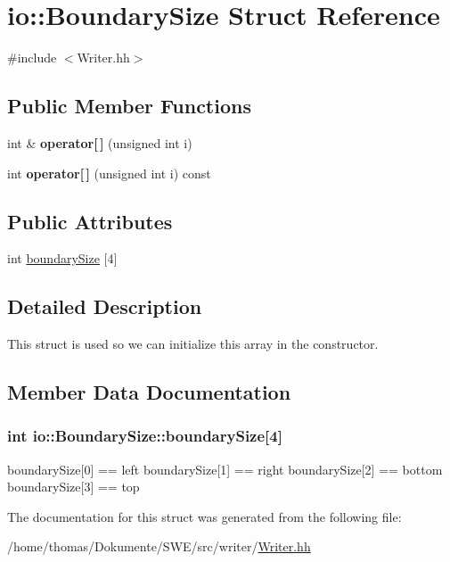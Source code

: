 \hypertarget{structio_1_1BoundarySize}{\section{io\-:\-:Boundary\-Size Struct Reference}
\label{structio_1_1BoundarySize}
}


{\ttfamily \#include $<$Writer.\-hh$>$}

\subsection*{Public Member Functions}
\begin{DoxyCompactItemize}
\item 
\hypertarget{structio_1_1BoundarySize_a4130ec88292d4a0eff9c402a90ef907d}{int \& {\bfseries operator\mbox{[}$\,$\mbox{]}} (unsigned int i)}\label{structio_1_1BoundarySize_a4130ec88292d4a0eff9c402a90ef907d}

\item 
\hypertarget{structio_1_1BoundarySize_ab7593d2a82890d5d255c30d1dd8fee08}{int {\bfseries operator\mbox{[}$\,$\mbox{]}} (unsigned int i) const }\label{structio_1_1BoundarySize_ab7593d2a82890d5d255c30d1dd8fee08}

\end{DoxyCompactItemize}
\subsection*{Public Attributes}
\begin{DoxyCompactItemize}
\item 
int \hyperlink{structio_1_1BoundarySize_ae1ac1aecc0b840076b68948dc2ceba8a}{boundary\-Size} \mbox{[}4\mbox{]}
\end{DoxyCompactItemize}


\subsection{Detailed Description}
This struct is used so we can initialize this array in the constructor. 

\subsection{Member Data Documentation}
\hypertarget{structio_1_1BoundarySize_ae1ac1aecc0b840076b68948dc2ceba8a}{
\subsubsection[{boundary\-Size}]{\setlength{\rightskip}{0pt plus 5cm}int io\-::\-Boundary\-Size\-::boundary\-Size\mbox{[}4\mbox{]}}}\label{structio_1_1BoundarySize_ae1ac1aecc0b840076b68948dc2ceba8a}
boundary\-Size\mbox{[}0\mbox{]} == left boundary\-Size\mbox{[}1\mbox{]} == right boundary\-Size\mbox{[}2\mbox{]} == bottom boundary\-Size\mbox{[}3\mbox{]} == top 

The documentation for this struct was generated from the following file\-:\begin{DoxyCompactItemize}
\item 
/home/thomas/\-Dokumente/\-S\-W\-E/src/writer/\hyperlink{Writer_8hh}{Writer.\-hh}\end{DoxyCompactItemize}
